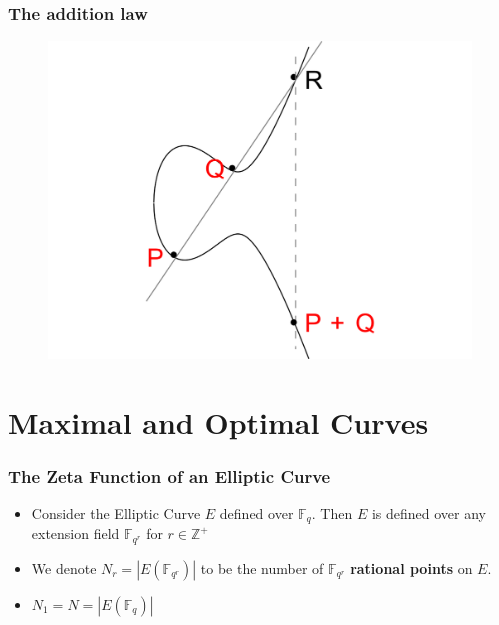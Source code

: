 \documentclass{beamer}
\newcommand{\Z}{\mathbb{Z}}
\newcommand{\F}{\mathbb{F}}
\theoremstyle{plain} %
\theoremstyle{definition}
\theoremstyle{remark}
\begin{document}
\begin{frame}
\frametitle{The addition law}

\begin{figure}
    \centering
    \includegraphics{Figures/EllipticCurveAddition}
    \caption{}
    \label{fig:my_label}
\end{figure}



\end{frame}


\section{Maximal and Optimal Curves}
\begin{frame}
\frametitle{The Zeta Function of an Elliptic Curve}
    \begin{itemize}
        \item Consider the Elliptic Curve $E$ defined over $\F_q$. Then $E$ is defined over any extension field $\F_{q^r}$ for $r \in \Z^+$
        
        \item We denote $N_r=|E(\F_{q^r})|$ to be the number of $\F_{q^r}$ \textbf{rational points} on $E$.
        
        \item $N_1=N=|E(\F_q)|$
    \end{itemize}


\end{frame}
\end{document}
